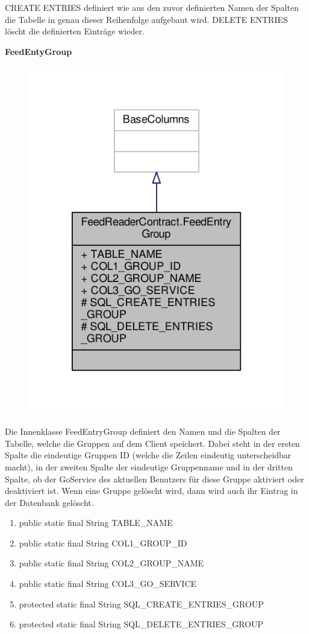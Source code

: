 CREATE ENTRIES definiert wie aus den zuvor definierten Namen der Spalten die Tabelle in genau dieser Reihenfolge aufgebaut wird.
DELETE ENTRIES löscht die definierten Einträge wieder.

\textbf{FeedEntyGroup}
\begin{figure}[H]
	\includegraphics[scale = 1]{res/umlClasses/feed_reader_contract_group.pdf}
	\centering
\end{figure}
Die Innenklasse FeedEntryGroup definiert den Namen und die Spalten der Tabelle, welche die Gruppen auf dem Client speichert. 
Dabei steht in der ersten Spalte die eindeutige Gruppen ID (welche die Zeilen eindeutig unterscheidbar macht), in der zweiten Spalte der eindeutige Gruppenname und in der dritten Spalte, ob der GoService des aktuellen Benutzers für diese Gruppe aktiviert oder deaktiviert ist.
Wenn eine Gruppe gelöscht wird, dann wird auch ihr Eintrag in der Datenbank gelöscht.
\begin{enumerate}
	\item public static final String TABLE_NAME
	\item public static final String COL1_GROUP_ID
	\item public static final String COL2_GROUP_NAME
	\item public static final String COL3_GO_SERVICE
	\item protected static final String SQL_CREATE_ENTRIES_GROUP
	\item protected static final String SQL_DELETE_ENTRIES_GROUP
\end{enumerate}

